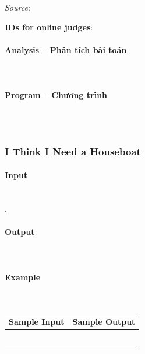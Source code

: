 \documentclass{article}
\begin{document}
\textit{Source}: 

\textbf{IDs for online judges}: 


\paragraph{Analysis -- Phân tích bài toán} \mbox{} \\


\paragraph{Program -- Chương trình} \mbox{} \\


\begin{lstlisting}

\end{lstlisting}


\subsubsection{I Think I Need a Houseboat}


\paragraph{Input} \mbox{} \\

.

\paragraph{Output}\mbox{} \\



\paragraph{Example}\mbox{} \\

\begin{table}[h]
    \centering
    \begin{tabular}{|l|r|}
        \hline
        \textbf{Sample Input} & \textbf{Sample Output} \\
        \hline
            &   \\ 
            &  \\ 
            &  \\ 
            &  \\ 
            &  \\ 
            &  \\ \hline
    \end{tabular}
\end{table}
\end{document}
